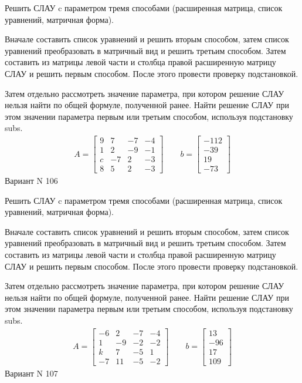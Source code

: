 \documentclass[11pt]{report}
\begin{document}
Решить СЛАУ c параметром тремя способами (расширенная матрица, список уравнений, матричная форма).

Вначале составить список уравнений и решить вторым способом,
затем список уравнений преобразовать в матричный вид и решить третьим способом.
Затем составить из матрицы левой части и столбца правой расширенную матрицу СЛАУ и решить первым способом.
После этого провести проверку подстановкой.

Затем отдельно рассмотреть значение параметра, при котором решение СЛАУ нельзя найти по общей формуле,
полученной ранее.
Найти решение СЛАУ при этом значении параметра первым или третьим способом, используя подстановку subs.
\begin{align*}
    A = \left[\begin{matrix}9 & 7 & -7 & -4\\1 & 2 & -9 & -1\\c & -7 & 2 & -3\\8 & 5 & 2 & -3\end{matrix}\right]
\qquad b = \left[\begin{matrix}-112\\-39\\19\\-73\end{matrix}\right]
\end{align*}
\newpage
Вариант N 106


Решить СЛАУ c параметром тремя способами (расширенная матрица, список уравнений, матричная форма).

Вначале составить список уравнений и решить вторым способом,
затем список уравнений преобразовать в матричный вид и решить третьим способом.
Затем составить из матрицы левой части и столбца правой расширенную матрицу СЛАУ и решить первым способом.
После этого провести проверку подстановкой.

Затем отдельно рассмотреть значение параметра, при котором решение СЛАУ нельзя найти по общей формуле,
полученной ранее.
Найти решение СЛАУ при этом значении параметра первым или третьим способом, используя подстановку subs.
\begin{align*}
    A = \left[\begin{matrix}-6 & 2 & -7 & -4\\1 & -9 & -2 & -2\\k & 7 & -5 & 1\\-7 & 11 & -5 & -2\end{matrix}\right]
\qquad b = \left[\begin{matrix}13\\-96\\17\\109\end{matrix}\right]
\end{align*}
\newpage
Вариант N 107
\end{document}
